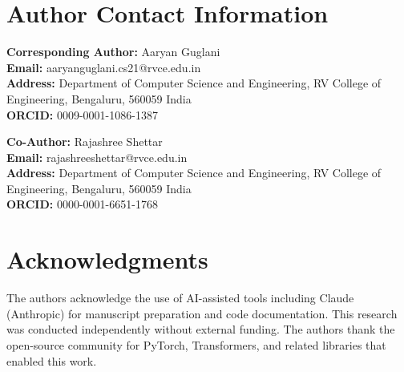 \documentclass[journal]{IEEEtran}
\begin{document}
\section*{Author Contact Information}
\textbf{Corresponding Author:} Aaryan Guglani\\
\textbf{Email:} aaryanguglani.cs21@rvce.edu.in\\
\textbf{Address:} Department of Computer Science and Engineering, RV College of Engineering, Bengaluru, 560059 India\\
\textbf{ORCID:} 0009-0001-1086-1387

\textbf{Co-Author:} Rajashree Shettar\\
\textbf{Email:} rajashreeshettar@rvce.edu.in\\
\textbf{Address:} Department of Computer Science and Engineering, RV College of Engineering, Bengaluru, 560059 India\\
\textbf{ORCID:} 0000-0001-6651-1768

\section*{Acknowledgments}
The authors acknowledge the use of AI-assisted tools including Claude (Anthropic) for manuscript preparation and code documentation. This research was conducted independently without external funding. The authors thank the open-source community for PyTorch, Transformers, and related libraries that enabled this work.
\end{document}
